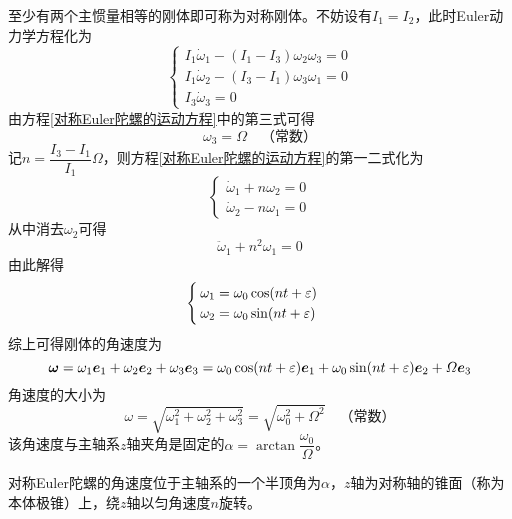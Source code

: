 至少有两个主惯量相等的刚体即可称为{\heiti 对称刚体}。不妨设有$I_1=I_2$，此时Euler动力学方程化为
\begin{equation}
	\begin{cases}
		I_1 \dot{\omega}_1 - (I_1-I_3)\omega_2 \omega_3 = 0 \\
		I_1 \dot{\omega}_2 - (I_3-I_1)\omega_3 \omega_1 = 0 \\
		I_3 \dot{\omega}_3 = 0
	\end{cases}
	\label{对称Euler陀螺的运动方程}
\end{equation}
由方程\eqref{对称Euler陀螺的运动方程}中的第三式可得
\begin{equation}
	\omega_3 = \varOmega \quad \text{（常数）}
	\label{对称Euler陀螺的解-1}
\end{equation}
记$n = \dfrac{I_3-I_1}{I_1} \varOmega$，则方程\eqref{对称Euler陀螺的运动方程}的第一二式化为
\begin{equation*}
	\begin{cases}
		\dot{\omega}_1 + n\omega_2 = 0 \\
		\dot{\omega}_2 - n\omega_1 = 0
	\end{cases}
\end{equation*}
从中消去$\omega_2$可得
\begin{equation*}
	\ddot{\omega}_1 + n^2\omega_1 = 0
\end{equation*}
由此解得
\begin{equation}
\begin{cases}
	\omega_1 = \omega_0 \cos(nt+\varepsilon) \\
	\omega_2 = \omega_0 \sin(nt+\varepsilon)
\end{cases}
\label{对称Euler陀螺的解-2}
\end{equation}
综上可得刚体的角速度为
\begin{equation}
	\boldsymbol{\omega} = \omega_1 \boldsymbol{e}_1 + \omega_2 \boldsymbol{e}_2 + \omega_3 \boldsymbol{e}_3 = \omega_0 \cos(nt+\varepsilon) \boldsymbol{e}_1 + \omega_0 \sin(nt+\varepsilon) \boldsymbol{e}_2 + \varOmega \boldsymbol{e}_3
	\label{对称Euler陀螺的解-3}
\end{equation}
角速度的大小为
\begin{equation*}
	\omega = \sqrt{\omega_1^2 +\omega_2^2 +\omega_3^2} = \sqrt{\omega_0^2 + \varOmega^2}\quad \text{（常数）}
\end{equation*}
该角速度与主轴系$z$轴夹角是固定的$\alpha = \arctan \dfrac{\omega_0}{\varOmega}$。

对称Euler陀螺的角速度位于主轴系的一个半顶角为$\alpha$，$z$轴为对称轴的锥面（称为{\heiti 本体极锥}）上，绕$z$轴以匀角速度$n$旋转。


